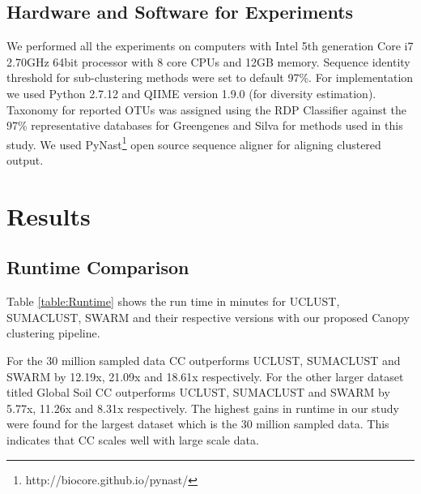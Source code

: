 \documentclass[10pt, conference, compsocconf]{IEEEtran}
\begin{document}
    

\subsection{\textbf{Hardware and Software for Experiments}}
We performed all the experiments on computers with Intel 5th generation Core i7 2.70GHz 64bit processor with 8 core CPUs and 
12GB memory. Sequence identity threshold for  
sub-clustering methods were set to default 97\%. For implementation we 
used Python 2.7.12 and QIIME \cite{MARQiime} version 1.9.0 (for diversity estimation).  Taxonomy for reported OTUs was assigned 
using the RDP Classifier \cite{MARRdp} against the 97\% representative databases for Greengenes \cite{MARGreen1} and Silva \cite{MARSilva} 
for methods used in this study. We used PyNast\footnote{http://biocore.github.io/pynast/} open source sequence aligner
  for aligning clustered output. 

\section{Results} 
\label{sec:Results}

\subsection{\textbf{Runtime Comparison}} Table \ref{table:Runtime} shows the run time in minutes for 
UCLUST, SUMACLUST, SWARM and their respective versions with our proposed Canopy clustering pipeline.


For the 30 million sampled data CC outperforms UCLUST, SUMACLUST and SWARM by 12.19x, 21.09x and 18.61x respectively. For the other larger dataset titled Global Soil CC outperforms UCLUST, SUMACLUST and SWARM by 5.77x, 11.26x and 8.31x respectively. The highest gains in runtime in our study were found for the largest dataset which is the 30 million sampled data. This indicates that CC scales well with large scale data.  
\end{document}
